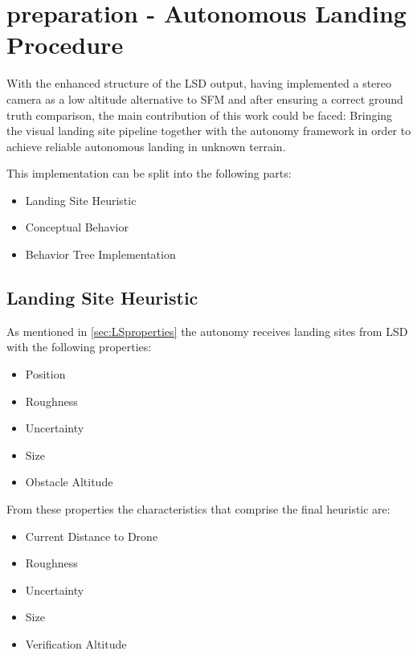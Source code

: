\chapter{preparation - Autonomous Landing Procedure}\label{chapter:core_implementation}


With the enhanced structure of the LSD output, having implemented a stereo camera as a low altitude alternative to SFM and after ensuring a correct ground truth comparison, the main contribution of this work could be faced: Bringing the visual landing site pipeline together with the autonomy framework in order to achieve reliable autonomous landing in unknown terrain.

This implementation can be split into the following parts:
\begin{itemize}
    \item Landing Site Heuristic
    \item Conceptual Behavior
    \item Behavior Tree Implementation
\end{itemize}



\section{Landing Site Heuristic}\label{subsubsec:LandingSiteHeuristic}

As mentioned in \cref{sec:LSproperties} the autonomy receives landing sites from LSD with the following properties:

\begin{itemize}
    \item Position
    \item Roughness
    \item Uncertainty
    \item Size
    \item Obstacle Altitude
\end{itemize}

From these properties the characteristics that comprise the final heuristic are:

\begin{itemize}
    \item Current Distance to Drone
    \item Roughness
    \item Uncertainty
    \item Size
    \item Verification Altitude
\end{itemize}

